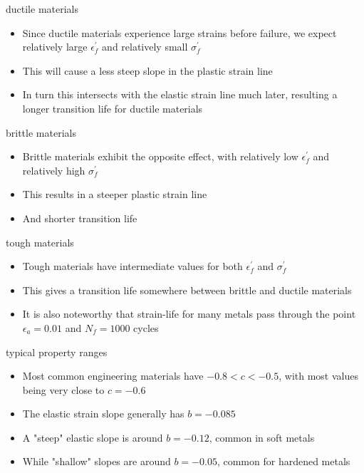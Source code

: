 \documentclass[10pt]{beamer}
\begin{document}
\begin{frame}{ductile materials}
	\begin{itemize}[<+->]
		\item Since ductile materials experience large strains before failure, we expect relatively large $\epsilon_f^\prime$ and relatively small $\sigma_f^\prime$
		\item This will cause a less steep slope in the plastic strain line
		\item In turn this intersects with the elastic strain line much later, resulting a longer transition life for ductile materials
	\end{itemize}
\end{frame}

\begin{frame}{brittle materials}
	\begin{itemize}[<+->]
		\item Brittle materials exhibit the opposite effect, with relatively low $\epsilon_f^\prime$ and relatively high $\sigma_f^\prime$
		\item This results in a steeper plastic strain line
		\item And shorter transition life 
	\end{itemize}
\end{frame}

\begin{frame}{tough materials}
	\begin{itemize}[<+->]
		\item Tough materials have intermediate values for both $\epsilon_f^\prime$ and $\sigma_f^\prime$
		\item This gives a transition life somewhere between brittle and ductile materials
		\item It is also noteworthy that strain-life for many metals pass through the point $\epsilon_a = 0.01$ and $N_f = 1000$ cycles
	\end{itemize}
\end{frame}

\begin{frame}{typical property ranges}
	\begin{itemize}[<+->]
		\item Most common engineering materials have $-0.8 < c < -0.5$, with most values being very close to $c=-0.6$
		\item The elastic strain slope generally has $b=-0.085$
		\item A "steep" elastic slope is around $b=-0.12$, common in soft metals
		\item While "shallow" slopes are around $b=-0.05$, common for hardened metals
	\end{itemize}
\end{frame}



\end{document}
